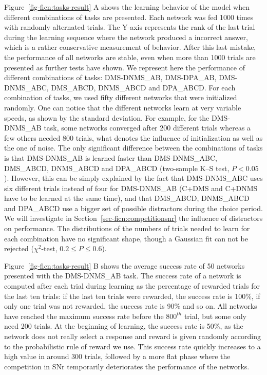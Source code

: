 \documentclass[
  11pt,
  a4paper,
]{scrbook}
\begin{document}
Figure~\ref{fig-ficn:tasks-result} A shows the learning behavior of the
model when different combinations of tasks are presented. Each network
was fed 1000 times with randomly alternated trials. The Y-axis
represents the rank of the last trial during the learning sequence where
the network produced a incorrect answer, which is a rather conservative
measurement of behavior. After this last mistake, the performance of all
networks are stable, even when more than 1000 trials are presented as
further tests have shown. We represent here the performance of different
combinations of tasks: DMS-DNMS\_AB, DMS-DPA\_AB, DMS-DNMS\_ABC,
DMS\_ABCD, DNMS\_ABCD and DPA\_ABCD. For each combination of tasks, we
used fifty different networks that were initialized randomly. One can
notice that the different networks learn at very variable speeds, as
shown by the standard deviation. For example, for the DMS-DNMS\_AB task,
some networks converged after 200 different trials whereas a few others
needed 800 trials, what denotes the influence of initialization as well
as the one of noise. The only significant difference between the
combinations of tasks is that DMS-DNMS\_AB is learned faster than
DMS-DNMS\_ABC, DMS\_ABCD, DNMS\_ABCD and DPA\_ABCD (two-sample K--S
test, \(P < 0.05\)). However, this can be simply explained by the fact
that DMS-DNMS\_ABC uses six different trials instead of four for
DMS-DNMS\_AB (C+DMS and C+DNMS have to be learned at the same time), and
that DMS\_ABCD, DNMS\_ABCD and DPA\_ABCD use a bigger set of possible
distractors during the choice period. We will investigate in
Section~\ref{sec-ficn:competitionsnr} the influence of distractors on
performance. The distributions of the numbers of trials needed to learn
for each combination have no significant shape, though a Gaussian fit
can not be rejected (\(\chi^2\)-test, \(0.2 \leq P \leq 0.6\)).

Figure~\ref{fig-ficn:tasks-result} B shows the average success rate of
50 networks presented with the DMS-DNMS\_AB task. The success rate of a
network is computed after each trial during learning as the percentage
of rewarded trials for the last ten trials: if the last ten trials were
rewarded, the success rate is 100\%, if only one trial was not rewarded,
the success rate is 90\% and so on. All networks have reached the
maximum success rate before the \(800^{th}\) trial, but some only need
200 trials. At the beginning of learning, the success rate is 50\%, as
the network does not really select a response and reward is given
randomly according to the probabilistic rule of reward we use. This
success rate quickly increases to a high value in around 300 trials,
followed by a more flat phase where the competition in SNr temporarily
deteriorates the performance of the networks.
\end{document}
